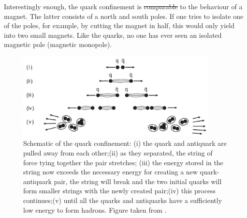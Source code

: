 \documentclass[ALICE,manyauthors]{cernphprep}
\newcommand{\LambdaQCD}     {\mbox{$\Lambda_{\textrm{QCD}}$}\xspace}
\providecommand{\DIFaddtex}[1]{{\protect\color{blue}\uwave{#1}}} %
\providecommand{\DIFdeltex}[1]{{\protect\color{red}\sout{#1}}}                      %
\providecommand{\DIFaddbegin}{} %
\providecommand{\DIFaddend}{} %
\providecommand{\DIFdelbegin}{} %
\providecommand{\DIFdelend}{} %
\providecommand{\DIFadd}[1]{\texorpdfstring{\DIFaddtex{#1}}{#1}} %
\providecommand{\DIFdel}[1]{\texorpdfstring{\DIFdeltex{#1}}{}} %
\newcommand{\DIFscaledelfig}{0.5}
\newlength{\DIFdelgraphicswidth} %
\newlength{\DIFdelgraphicsheight} %
\newcommand{\DIFaddincludegraphics}[2][]{{\color{blue}\fbox{\DIFOincludegraphics[#1]{#2}}}} %
\newcommand{\DIFdelincludegraphics}[2][]{%
\sbox{\DIFdelgraphicsbox}{\DIFOincludegraphics[#1]{#2}}%
\settoboxwidth{\DIFdelgraphicswidth}{\DIFdelgraphicsbox} %
\settoboxtotalheight{\DIFdelgraphicsheight}{\DIFdelgraphicsbox} %
\scalebox{\DIFscaledelfig}{%
\parbox[b]{\DIFdelgraphicswidth}{\usebox{\DIFdelgraphicsbox}\\[-\baselineskip] \rule{\DIFdelgraphicswidth}{0em}}\llap{\resizebox{\DIFdelgraphicswidth}{\DIFdelgraphicsheight}{%
\setlength{\unitlength}{\DIFdelgraphicswidth}%
\begin{picture}(1,1)%
\thicklines\linethickness{2pt} %
{\color[rgb]{1,0,0}\put(0,0){\framebox(1,1){}}}%
{\color[rgb]{1,0,0}\put(0,0){\line( 1,1){1}}}%
{\color[rgb]{1,0,0}\put(0,1){\line(1,-1){1}}}%
\end{picture}%
}\hspace*{3pt}}} %
} %
\DeclareRobustCommand{\DIFaddbegin}{\DIFOaddbegin \let\includegraphics\DIFaddincludegraphics} %
\DeclareRobustCommand{\DIFaddend}{\DIFOaddend \let\includegraphics\DIFOincludegraphics} %
\DeclareRobustCommand{\DIFdelbegin}{\DIFOdelbegin \let\includegraphics\DIFdelincludegraphics} %
\DeclareRobustCommand{\DIFdelend}{\DIFOaddend \let\includegraphics\DIFOincludegraphics} %
\begin{document}
Interestingly enough, the quark confinement is \DIFdelbegin \DIFdel{comparable }\DIFdelend \DIFaddbegin \DIFadd{analogous }\DIFaddend to the behaviour of a magnet. The latter consists of a north and south poles. If one tries to isolate one of the poles, for example, by cutting the magnet in half, this would only yield into two small magnets. Like the quarks, no one has ever seen an isolated magnetic pole (magnetic monopole).

\begin{figure}[t]
\begin{center}
\includegraphics[width=0.9\textwidth]{Figs/Chapter2/Screenshot_20230220_214232.eps}
\end{center}
\caption{Schematic of the quark confinement: (i) the quark and antiquark are pulled away from each other;(ii) as they separated, the string of force tying together the pair stretches; (iii) the energy stored in the string now exceeds the necessary energy for creating a new quark-antiquark pair, the string will break and the two initial quarks will form smaller strings with the newly created pair;(iv) this process continues;(v) until all the quarks and antiquarks have a sufficiently low energy to form hadrons. Figure taken from \cite{thomsonModernParticlePhysics2013}.}
\label{fig:QuarkFragmentation}
\end{figure}

\end{document}
